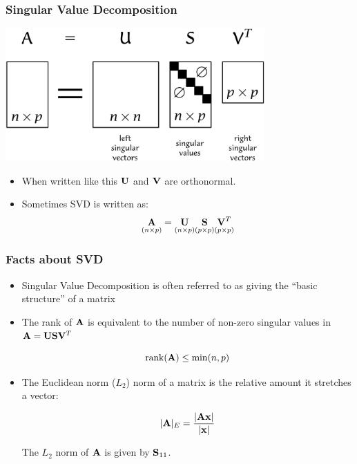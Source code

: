 \documentclass{beamer}
\DeclareMathOperator{\rank}{rank}
\begin{document}
\begin{frame}
  \frametitle{Singular Value Decomposition}

\includegraphics[height=2in]{fig-svd-overview}

\smallskip
\begin{itemize}
  \item When written like this $\mathbf{U}$ and $\mathbf{V}$ are orthonormal.

  \item Sometimes SVD is written as:
\[
\underset{(n \times p)}{\mathbf{A}} = \underset{(n \times p)}{\mathbf{U}} \underset{(p \times p)}{\mathbf{S}} \underset{(p \times p)}{\mathbf{V}^T} 
\]

\end{itemize}


\end{frame}



\begin{frame}
  \frametitle{Facts about SVD}

\begin{itemize}
\item Singular Value Decomposition is often referred to as giving the ``basic structure'' of a matrix

\item The rank of $\mathbf{A}$ is equivalent to the number of non-zero singular values in $ \mathbf{A} = \mathbf{U}\mathbf{S}\mathbf{V}^T $

$$ \rank(\Mtx{A}) \leq \min(n,p) $$


\item  The Euclidean norm ($L_2$) norm of a matrix is the relative amount it stretches a vector:

$$ |\mathbf{A}|_E = \frac{|\mathbf{A}\mathbf{x}|}{|\mathbf{x}|} $$

The $L_2$ norm of $\mathbf{A}$ is given by $\mathbf{S}_{11}$.
\end{itemize}



\end{frame}
\end{document}
